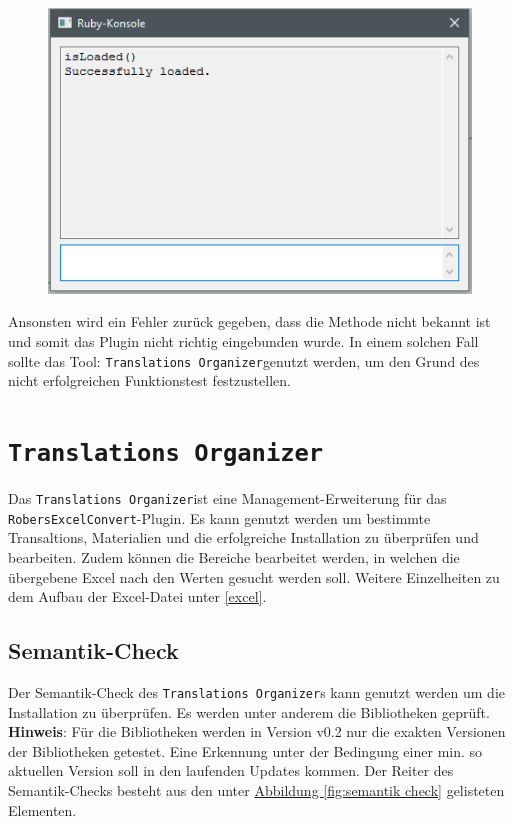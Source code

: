 \documentclass{book}
\newcommand{\robersexcelconvert}{\texttt{RobersExcelConvert}\xspace}
\newcommand{\assisttool}{\texttt{Translations Organizer}}
\newcommand{\hinweis}[1]{\newline \textbf{Hinweis}: #1 \newline}
\begin{document}
			\begin{figure}[H]
				\centering
				\includegraphics[scale=0.6]{pics/funktionstest.png}
				\label{funktionstest-success}
			\end{figure}
			
			Ansonsten wird ein Fehler zurück gegeben, dass die Methode nicht bekannt ist und somit das Plugin nicht richtig eingebunden wurde. In einem solchen Fall sollte das Tool: \assisttool genutzt werden, um den Grund des nicht erfolgreichen Funktionstest festzustellen.
	\chapter{\assisttool}
		Das \assisttool ist eine Management-Erweiterung für das \robersexcelconvert-Plugin. Es kann genutzt werden um bestimmte Transaltions, Materialien und die erfolgreiche Installation zu überprüfen und bearbeiten. Zudem können die Bereiche bearbeitet werden, in welchen die übergebene Excel nach den Werten gesucht werden soll. Weitere Einzelheiten zu dem Aufbau der Excel-Datei unter \ref{excel}. 
		\section{Semantik-Check}\label{semantic check}
			Der Semantik-Check des \assisttool s kann genutzt werden um die Installation zu überprüfen. Es werden unter anderem die Bibliotheken geprüft. 
			\hinweis{Für die Bibliotheken werden in Version v0.2 nur die exakten Versionen der Bibliotheken getestet. Eine Erkennung unter der Bedingung einer min. so aktuellen Version soll in den laufenden Updates kommen.}
			Der Reiter des Semantik-Checks besteht aus den unter \hyperref[fig:semantik check]{Abbildung \ref{fig:semantik check}} gelisteten Elementen.				
			
\end{document}
